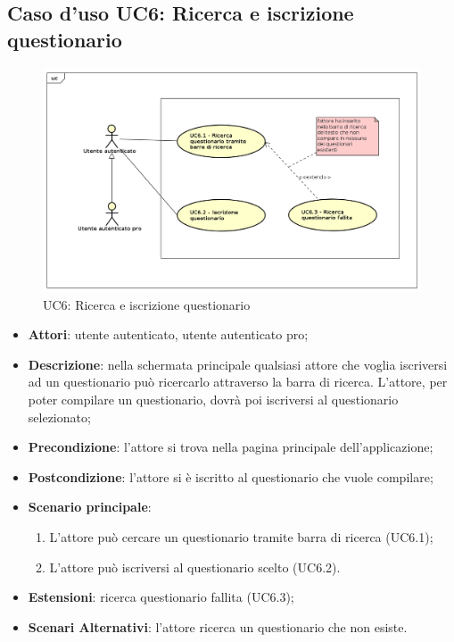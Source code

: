\newpage
\subsection{Caso d'uso UC6: Ricerca e iscrizione questionario}
\label{UC6}
\begin{figure}[h]
\centering
\includegraphics[scale=0.5,keepaspectratio]{UML/UC6.png}
\caption{UC6: Ricerca e iscrizione questionario}
\end{figure}
\FloatBarrier
\begin{itemize}
\item\textbf{Attori}: utente autenticato, utente autenticato pro;
\item\textbf{Descrizione}: nella schermata principale qualsiasi attore che voglia iscriversi ad un questionario può ricercarlo attraverso la barra di ricerca. L'attore, per poter compilare un questionario, dovrà poi iscriversi al questionario selezionato;	
\item\textbf{Precondizione}: l'attore si trova nella pagina principale dell'applicazione;
\item\textbf{Postcondizione}: l'attore si è iscritto al questionario che vuole compilare;
\item\textbf{Scenario principale}:
\begin{enumerate}
\item L'attore può cercare un questionario tramite barra di ricerca (UC6.1);
\item L'attore può iscriversi al questionario scelto (UC6.2).
\end{enumerate}
\item\textbf{Estensioni}: ricerca questionario fallita (UC6.3);
\item\textbf{Scenari Alternativi}: l'attore ricerca un questionario che non esiste. 
\end{itemize}

